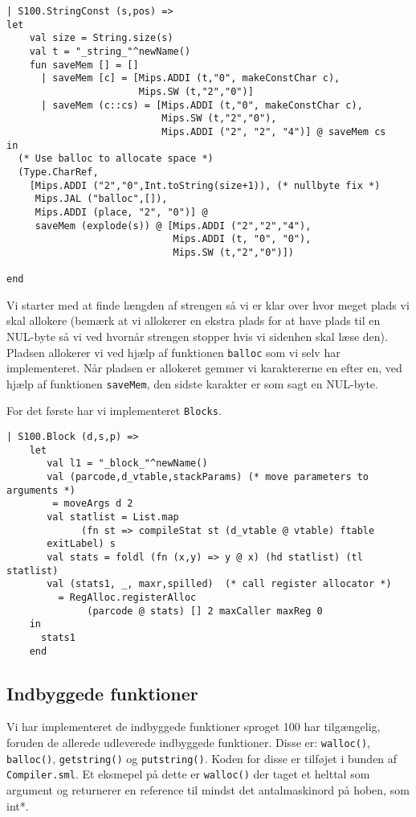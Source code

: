 \documentclass[12pt]{article}
\begin{document}
\begin{verbatim}
| S100.StringConst (s,pos) =>
let
    val size = String.size(s)
    val t = "_string_"^newName()
    fun saveMem [] = []
      | saveMem [c] = [Mips.ADDI (t,"0", makeConstChar c),
                       Mips.SW (t,"2","0")]
      | saveMem (c::cs) = [Mips.ADDI (t,"0", makeConstChar c),
                           Mips.SW (t,"2","0"),
                           Mips.ADDI ("2", "2", "4")] @ saveMem cs
in 
  (* Use balloc to allocate space *)
  (Type.CharRef,
    [Mips.ADDI ("2","0",Int.toString(size+1)), (* nullbyte fix *)
     Mips.JAL ("balloc",[]), 
     Mips.ADDI (place, "2", "0")] @
     saveMem (explode(s)) @ [Mips.ADDI ("2","2","4"),
                             Mips.ADDI (t, "0", "0"),
                             Mips.SW (t,"2","0")])              
           
end
\end{verbatim}

Vi starter med at finde længden af strengen så vi er klar over hvor meget plads
vi skal allokere (bemærk at vi allokerer en ekstra
plads for at have plads til en NUL-byte så vi ved hvornår strengen stopper hvis
vi sidenhen skal læse den). Pladsen allokerer vi ved hjælp af funktionen
\texttt{balloc} som vi selv har implementeret. Når pladsen er allokeret gemmer
vi karaktererne en efter en, ved hjælp af funktionen \texttt{saveMem}, den sidste
karakter er som sagt en NUL-byte. 

For det første har vi implementeret \texttt{Blocks}. 

\begin{verbatim}
| S100.Block (d,s,p) => 
    let
       val l1 = "_block_"^newName()
       val (parcode,d_vtable,stackParams) (* move parameters to arguments *)
        = moveArgs d 2
       val statlist = List.map 
             (fn st => compileStat st (d_vtable @ vtable) ftable
       exitLabel) s
       val stats = foldl (fn (x,y) => y @ x) (hd statlist) (tl statlist)
       val (stats1, _, maxr,spilled)  (* call register allocator *)
         = RegAlloc.registerAlloc
              (parcode @ stats) [] 2 maxCaller maxReg 0
    in
      stats1
    end
\end{verbatim}


\subsection{Indbyggede funktioner}
Vi har implementeret de indbyggede funktioner sproget 100 har tilgængelig,
foruden de allerede udleverede indbyggede funktioner. Disse er:
\texttt{walloc()}, \texttt{balloc()}, \texttt{getstring()} og
\texttt{putstring()}. Koden for disse er tilføjet i bunden af
\texttt{Compiler.sml}. Et eksmepel på dette er \texttt{walloc()} der taget et
helttal som argument og returnerer en reference til mindst det antalmaskinord på
hoben, som int*.\\
\end{document}
